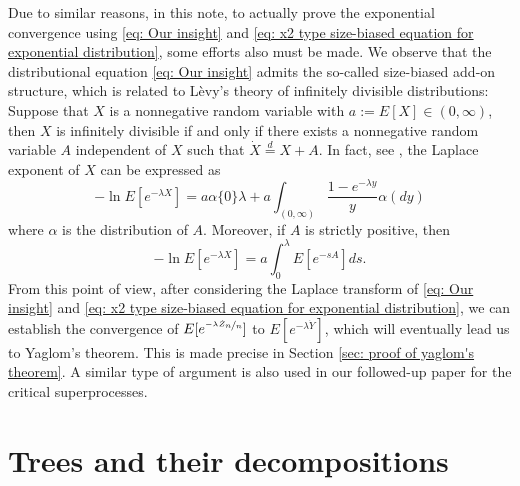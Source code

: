 \documentclass[12pt,a4paper]{amsart}
\numberwithin{equation}{section}
\begin{document}
	Due to similar reasons, in this note, 
	to actually prove the exponential convergence using \eqref{eq: Our insight} and \eqref{eq: x2 type size-biased equation for exponential distribution}, some efforts also must be made. 
	We observe that the distributional equation \eqref{eq: Our insight} admits the so-called size-biased add-on structure, which is related to L\`evy's theory of infinitely divisible distributions: Suppose that 
$X$ is a nonnegative random variable with $ a := E [X]\in (0,\infty)$, 
	then $X$ is infinitely divisible if and only if there exists 
a nonnegative random variable $A$ independent of $X$ such that
$\dot X 	\overset{d} = X + A$. 
	In fact, see \cite[Theorem 10.1]{ArratiaGoldsteinKochman2013}, the Laplace exponent of $X$ can be expressed as
\[
	-\ln E[ e^{-\lambda X}] =  a \alpha\{0\} \lambda+ a \int_{(0,\infty)} \frac{1 - e^{-\lambda y}}{y} \alpha(dy)
\]
	where $\alpha$ is the distribution of $A$.
	Moreover, if $A$ is strictly positive, then
\begin{equation}\label{eq: Laplace exponent for size-biased add-on equation}
	-\ln E[ e^{-\lambda X}] 
	=  a  \int_0^\lambda E [e^{-s A}] ds.
\end{equation}
	From this point of view, after considering the Laplace transform of \eqref{eq: Our insight} and \eqref{eq: x2 type size-biased equation for exponential distribution}, we can establish the convergence of $E[e^{\nicefrac{-\lambda \dot Z_n}{n}}]$ to $E[e^{-\lambda \dot {Y}}]$, which will eventually lead us to Yaglom's theorem.
	This is made precise in Section \ref{sec: proof of yaglom's theorem}.
 A similar type of argument is also  used in our followed-up 
	paper \cite{RenSongSun2017Spine} for the critical superprocesses.
	
	
\section{Trees and their decompositions}
\label{sec:preliminary}
\end{document}
